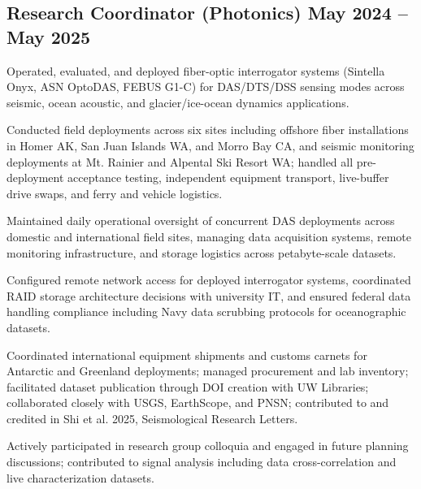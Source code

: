 \subsection{{Research Coordinator (Photonics) \hfill May 2024 – May 2025}}
\begin{zitemize}
    \item Operated, evaluated, and deployed fiber-optic interrogator systems (Sintella Onyx, ASN OptoDAS, FEBUS G1-C) for DAS/DTS/DSS sensing modes across seismic, ocean acoustic, and glacier/ice-ocean dynamics applications.
    \item Conducted field deployments across six sites including offshore fiber installations in Homer AK, San Juan Islands WA, and Morro Bay CA, and seismic monitoring deployments at Mt. Rainier and Alpental Ski Resort WA; handled all pre-deployment acceptance testing, independent equipment transport, live-buffer drive swaps, and ferry and vehicle logistics.
    \item Maintained daily operational oversight of concurrent DAS deployments across domestic and international field sites, managing data acquisition systems, remote monitoring infrastructure, and storage logistics across petabyte-scale datasets.
    \item Configured remote network access for deployed interrogator systems, coordinated RAID storage architecture decisions with university IT, and ensured federal data handling compliance including Navy data scrubbing protocols for oceanographic datasets.
    \item Coordinated international equipment shipments and customs carnets for Antarctic and Greenland deployments; managed procurement and lab inventory; facilitated dataset publication through DOI creation with UW Libraries; collaborated closely with USGS, EarthScope, and PNSN; contributed to and credited in Shi et al. 2025, Seismological Research Letters.
    \item Actively participated in research group colloquia and engaged in future planning discussions; contributed to signal analysis including data cross-correlation and live characterization datasets.
\end{zitemize}
\vspace{6pt}
